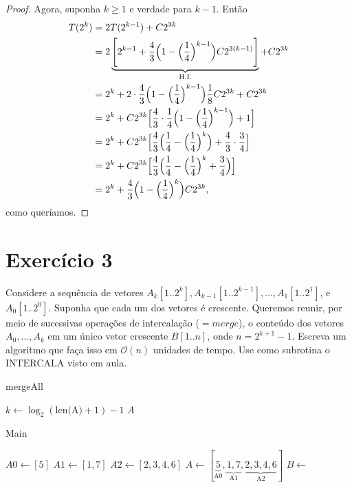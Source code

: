 \documentclass{article}
\newcommand{\bigO}[1]{\ensuremath{\mathcal{O}(#1)}}
\begin{document}
\begin{proof}
Agora, suponha $k \geq 1$ e verdade para $k-1$. Então
\begin{align*}
  T(2^k) &= 2 T(2^{k-1}) + C2^{3k} \\
  &= 2 \underbrace{\Biggl[ 2^{k-1} + \frac{4}{3}\Bigl(1 - \Bigl(\frac{1}{4}\Bigr)^{k-1}\Bigr) C2^{3(k-1)}\Biggr]}_\text{H.I.} + C2^{3k} \\
  &= 2^k + 2 \cdot \frac{4}{3}\Bigl(1 - \Bigl(\frac{1}{4}\Bigr)^{k-1}\Bigr) \frac{1}{8}C2^{3k} + C2^{3k} \\
  &= 2^k + C2^{3k} \Bigl[\frac{4}{3}\cdot\frac{1}{4}\Bigl(1 - \Bigl(\frac{1}{4}\Bigr)^{k-1}\Bigr) + 1\Bigr] \\
  &= 2^k + C2^{3k} \Bigl[\frac{4}{3}\Bigl(\frac{1}{4} - \Bigl(\frac{1}{4}\Bigr)^{k}\Bigr) + \frac{4}{3}\cdot\frac{3}{4}\Bigr] \\
  &= 2^k + C2^{3k} \Bigl[\frac{4}{3}\Bigl(\frac{1}{4} - \Bigl(\frac{1}{4}\Bigr)^{k} + \frac{3}{4}\Bigr)\Bigr] \\
  &= 2^k + \frac{4}{3}\Bigl(1 - \Bigl(\frac{1}{4}\Bigr)^{k}\Bigr) C2^{3k} ,
\end{align*}
como queríamos.

\end{proof}

\newpage

\section*{Exercício 3}
Considere a sequência de vetores $A_k[1..2^k], A_{k-1}[1..2^{k-1}], \dots, A_1[1..2^1]$, e $A_0[1..2^0]$.
Suponha que cada um dos vetores é crescente.
Queremos reunir, por meio de sucessivas operações de intercalação ($= merge$), o conteúdo dos vetores $A_0, \dots, A_k$ em um único vetor crescente $B[1..n]$, onde $n = 2^{k+1} - 1$.
Escreva um algoritmo que faça isso em $\bigO{n}$ unidades de tempo. Use como subrotina o $\mbox{INTERCALA}$ visto em aula.

\begin{algorithm}
\caption{mergeAll}
\begin{algorithmic}[1]
  \State $k \gets \log_2(\text{len(A)} + 1) - 1$
    \State {}
  \EndFor
  \State \Return $A$
\EndProcedure
\end{algorithmic}
\end{algorithm}

\begin{algorithm}
\caption{Main}
\begin{algorithmic}[1]
\State $A0 \gets [5]$
\State $A1 \gets [1, 7]$
\State $A2 \gets [2, 3, 4, 6]$
\State $A \gets [\underbrace{5}_\text{A0}, \underbrace{1, 7}_\text{A1}, \underbrace{2, 3, 4, 6}_\text{A2}]$
\State $B \gets$
\end{algorithmic}
\end{algorithm}


\newpage
\end{document}
